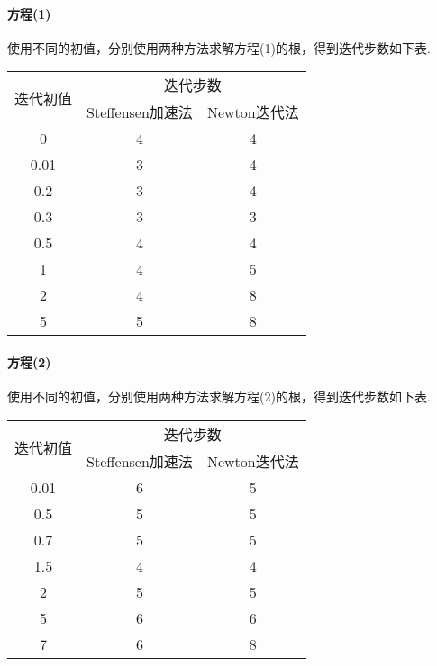 \paragraph{方程(1)} 使用不同的初值，分别使用两种方法求解方程(1)的根，得到迭代步数如下表.
\begin{table}[H]
\centering
\begin{tabular}{|c|c|c|}
\hline
\multirow{2}{*}{迭代初值} & \multicolumn{2}{c|}{迭代步数} \\ \cline{2-3} 
                      & Steffensen加速法        & Newton迭代法         \\ \hline
0                     & 4            & 4           \\ \hline
0.01                   & 3            & 4            \\ \hline
0.2                   & 3            & 4            \\ \hline
0.3                   & 3            & 3            \\ \hline
0.5                   & 4            & 4            \\ \hline
1                     & 4            & 5            \\ \hline
2                     & 4            & 8            \\ \hline
5                     & 5            & 8            \\ \hline
\end{tabular}
\end{table}

\paragraph{方程(2)} 使用不同的初值，分别使用两种方法求解方程(2)的根，得到迭代步数如下表.
\begin{table}[H]
\centering
\begin{tabular}{|c|c|c|}
\hline
\multirow{2}{*}{迭代初值} & \multicolumn{2}{c|}{迭代步数} \\ \cline{2-3} 
                      & Steffensen加速法        & Newton迭代法         \\ \hline
0.01                   & 6            & 5            \\ \hline
0.5                   & 5            & 5            \\ \hline
0.7                   & 5            & 5            \\ \hline
1.5                     & 4            & 4            \\ \hline
2                     & 5            & 5            \\ \hline
5                     & 6            & 6            \\ \hline
7                     & 6            & 8            \\ \hline
\end{tabular}
\end{table}


